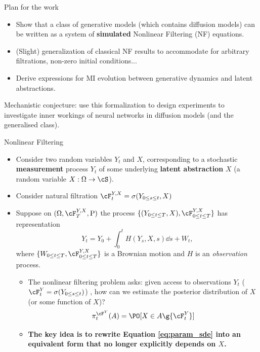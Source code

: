 \begin{frame}{Plan for the work}
\begin{itemize}
    \item Show that a class of generative models (which contains diffusion models) can be written as a system of \textbf{simulated} Nonlinear Filtering (NF) equations.
    \item (Slight) generalization of classical NF results to accommodate for arbitrary filtrations, non-zero initial conditions...
    \item Derive expressions for MI evolution between generative dynamics and latent abstractions.
\end{itemize}
    Mechanistic conjecture: use this formalization to design experiments to investigate inner workings of neural networks in diffusion models (and the generalised class).
\end{frame}

\begin{frame}[allowframebreaks]{Nonlinear Filtering}

\begin{itemize}
\item Consider two random variables $Y_t$ and $X$, corresponding to a stochastic\textbf{ measurement} process $Y_t$ of some underlying \textbf{latent abstraction} $X$ (a random variable $X:\Omega\rightarrow \cS$).
\item Consider natural filtration $\cF^{Y,X}_t=\sigma( Y_{0\leq s\leq t},X )$
\item Suppose on $(\Omega,\cF^{Y,X}_{T},\mathrm{P})$ the process $\{(Y_{0\leq t\leq T},X),\cF^{Y,X}_{0\leq t\leq T}\}$ has representation
\begin{equation}\label{eq:param_sde}
    Y_t=Y_0+\int_0^t H(Y_s,X,s) \dd s+ W_t,
\end{equation}
where $\{W_{0\leq t\leq T},\cF^{Y,X}_{0\leq t\leq T}\}$ is a Brownian motion and $H$
is an \textit{observation} process. 
\framebreak
  \begin{itemize}
    \item The nonlinear filtering problem asks: given access to observations $Y_t$ ( $\cF^Y_t=\sigma(Y_{0\leq s\leq t})$) , how can we estimate the posterior distribution of $X$ (or some function of $X$)?
    \[\pi^{\cF^Y}_t(A)=\PO[ X\in A\g {\cF_t^Y}]\]

    \item \textbf{The key idea is to rewrite Equation \ref{eq:param_sde} into an equivalent form that no longer explicitly depends on $X$.}
  \end{itemize}
\end{itemize}

\end{frame}

